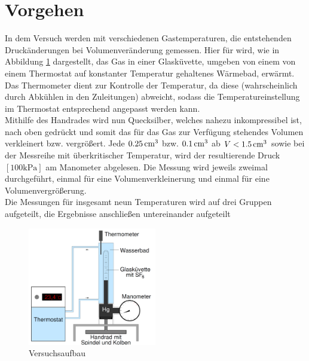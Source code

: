 \section{Vorgehen}
In dem Versuch werden mit verschiedenen Gastemperaturen, die entstehenden Druckänderungen bei Volumenveränderung gemessen. Hier für wird, wie in Abbildung \ref{fig:Aufbau} dargestellt, das Gas in einer Glasküvette, umgeben von einem von einem Thermostat auf konstanter Temperatur gehaltenes Wärmebad, erwärmt. Das Thermometer dient zur Kontrolle der Temperatur, da diese (wahrscheinlich durch Abkühlen in den Zuleitungen) abweicht, sodass die Temperatureinstellung im Thermostat entsprechend angepasst werden kann.\\
 Mithilfe des Handrades wird nun Quecksilber, welches nahezu inkompressibel ist, nach oben gedrückt und somit das für das Gas zur Verfügung stehendes Volumen verkleinert bzw. vergrößert. Jede $\unit[0.25]{cm^3}$ bzw. $\unit[0.1]{cm^3}$ ab $V<\unit[1.5]{cm^3}$ sowie bei der Messreihe mit überkritischer Temperatur, wird der resultierende Druck $[\mathrm{100kPa}]$ am Manometer abgelesen. Die Messung wird jeweils zweimal durchgeführt, einmal für eine Volumenverkleinerung und einmal für eine Volumenvergrößerung.\\
Die Messungen für insgesamt neun Temperaturen wird auf drei Gruppen aufgeteilt, die Ergebnisse anschließen untereinander aufgeteilt


\begin{figure}
\begin{center}
\includegraphics[width=0.5\textwidth]{Bilder/Versuchsaufbau.png}
\caption{Versuchsaufbau}
\label{fig:Aufbau}
\end{center}
\end{figure}